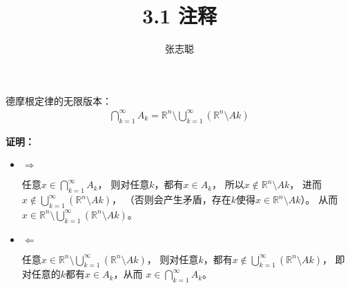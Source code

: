 \documentclass{article}
\begin{document}
\title{3.1 注释}
\author{张志聪}
\maketitle

\begin{zremark}
  德摩根定律的无限版本：
  \begin{align*}
    \bigcap\limits_{k = 1}^\infty A_{k}
    = \mathbb{R}^n \setminus \bigcup\limits_{k = 1}^\infty (\mathbb{R}^n \setminus A{k})
  \end{align*}
\end{zremark}

\textbf{证明：}

\begin{itemize}
  \item $\Rightarrow$
  
  任意$x \in \bigcap\limits_{k = 1}^\infty A_{k}$，
  则对任意$k$，都有$x \in A_k$，
  所以$x \notin \mathbb{R}^n \setminus A{k}$，
  进而$x \notin \bigcup\limits_{k = 1}^\infty (\mathbb{R}^n \setminus A{k})$，
  （否则会产生矛盾，存在$k$使得$x \in \mathbb{R}^n \setminus A{k}$）。
  从而$x \in \mathbb{R}^n \setminus \bigcup\limits_{k = 1}^\infty (\mathbb{R}^n \setminus A{k})$。

  \item $\Leftarrow$

  任意$x \in \mathbb{R}^n \setminus \bigcup\limits_{k = 1}^\infty (\mathbb{R}^n \setminus A{k})$，
  则对任意$k$，都有$x \notin \bigcup\limits_{k = 1}^\infty (\mathbb{R}^n \setminus A{k})$，
  即对任意的$k$都有$x \in A_k$，从而
  $x \in \bigcap\limits_{k = 1}^\infty A_{k}$。
  
\end{itemize}
\end{document}
